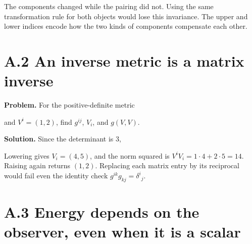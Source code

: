 \documentclass[
  11pt,
  letterpaper,
  oneside,
  openany]{scrbook}
\begin{document}
The components changed while the pairing did not. Using the same
transformation rule for both objects would lose this invariance. The
upper and lower indices encode how the two kinds of components
compensate each other.

\hypertarget{a.2-an-inverse-metric-is-a-matrix-inverse}{%
\section{A.2 An inverse metric is a matrix
inverse}\label{a.2-an-inverse-metric-is-a-matrix-inverse}}

\textbf{Problem.} For the positive-definite metric

\begin{center}
\begingroup
{}
\ifdim\wd\grmathbox>\linewidth
\resizebox{\linewidth}{!}{\usebox{\grmathbox}}
\else\usebox{\grmathbox}\fi
\endgroup
\end{center}

and \(V^i=(1,2)\), find \(g^{ij}\), \(V_i\), and \(g(V,V)\).

\textbf{Solution.} Since the determinant is \(3\),

\begin{center}
\begingroup
{}
\ifdim\wd\grmathbox>\linewidth
\resizebox{\linewidth}{!}{\usebox{\grmathbox}}
\else\usebox{\grmathbox}\fi
\endgroup
\end{center}

Lowering gives \(V_i=(4,5)\), and the norm squared is
\(V^iV_i=1\cdot4+2\cdot5=14\). Raising again returns \((1,2)\).
Replacing each matrix entry by its reciprocal would fail even the
identity check \(g^{ik}g_{kj}=\delta^i{}_j\).

\hypertarget{a.3-energy-depends-on-the-observer-even-when-it-is-a-scalar}{%
\section{A.3 Energy depends on the observer, even when it is a
scalar}\label{a.3-energy-depends-on-the-observer-even-when-it-is-a-scalar}}
\end{document}
